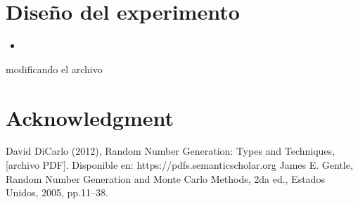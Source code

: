 \documentclass[conference]{IEEEtran}
\begin{document}
\section{Dise\~no del experimento}
\begin{itemize}

\item 
\end{itemize}

modificando el archivo

\section*{Acknowledgment}



\begin{thebibliography}{00}
 David DiCarlo (2012), Random Number Generation: Types and Techniques, [archivo PDF]. Disponible en: https://pdfs.semanticscholar.org
 James E. Gentle, Random Number Generation and Monte Carlo Methods, 2da ed., Estados Unidos, 2005, pp.11--38.
\end{thebibliography}
\vspace{12pt}
\end{document}
